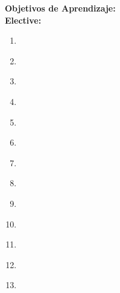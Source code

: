 \noindent \textbf{Objetivos de Aprendizaje:}\\
\noindent \textbf{Elective:}
\begin{enumerate}
	\setcounter{enumi}{0}
	\item \IMRelationalDatabasesLOPrepare\xspace[\IMRelationalDatabasesLOPrepareLevel]\label{sec:BOK:IMRelationalDatabasesLOPrepare}
	\item \IMRelationalDatabasesLOExplainAndConcepts\xspace[\IMRelationalDatabasesLOExplainAndConceptsLevel]\label{sec:BOK:IMRelationalDatabasesLOExplainAndConcepts}
	\item \IMRelationalDatabasesLODemonstrateUse\xspace[\IMRelationalDatabasesLODemonstrateUseLevel]\label{sec:BOK:IMRelationalDatabasesLODemonstrateUse}
	\item \IMRelationalDatabasesLOWriteQueries\xspace[\IMRelationalDatabasesLOWriteQueriesLevel]\label{sec:BOK:IMRelationalDatabasesLOWriteQueries}
	\item \IMRelationalDatabasesLOWriteQueriesTuple\xspace[\IMRelationalDatabasesLOWriteQueriesTupleLevel]\label{sec:BOK:IMRelationalDatabasesLOWriteQueriesTuple}
	\item \IMRelationalDatabasesLODetermineTheBetween\xspace[\IMRelationalDatabasesLODetermineTheBetweenLevel]\label{sec:BOK:IMRelationalDatabasesLODetermineTheBetween}
	\item \IMRelationalDatabasesLOConnect\xspace[\IMRelationalDatabasesLOConnectLevel]\label{sec:BOK:IMRelationalDatabasesLOConnect}
	\item \IMRelationalDatabasesLOComputeTheA\xspace[\IMRelationalDatabasesLOComputeTheALevel]\label{sec:BOK:IMRelationalDatabasesLOComputeTheA}
	\item \IMRelationalDatabasesLODetermineWhether\xspace[\IMRelationalDatabasesLODetermineWhetherLevel]\label{sec:BOK:IMRelationalDatabasesLODetermineWhether}
	\item \IMRelationalDatabasesLOEvaluateATo\xspace[\IMRelationalDatabasesLOEvaluateAToLevel]\label{sec:BOK:IMRelationalDatabasesLOEvaluateATo}
	\item \IMRelationalDatabasesLODescribeTheBcnf\xspace[\IMRelationalDatabasesLODescribeTheBcnfLevel]\label{sec:BOK:IMRelationalDatabasesLODescribeTheBcnf}
	\item \IMRelationalDatabasesLOExplainTheNormalization\xspace[\IMRelationalDatabasesLOExplainTheNormalizationLevel]\label{sec:BOK:IMRelationalDatabasesLOExplainTheNormalization}
	\item \IMRelationalDatabasesLODescribeWhatMulti\xspace[\IMRelationalDatabasesLODescribeWhatMultiLevel]\label{sec:BOK:IMRelationalDatabasesLODescribeWhatMulti}
\end{enumerate}


